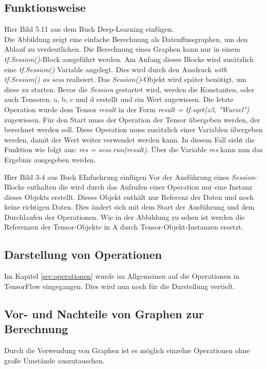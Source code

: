 \subsection{Funktionsweise}
\label{sec:graphenFunktionsweise}
Hier Bild 5.11 aus dem Buch Deep-Learning einfügen.\\
Die Abbildung zeigt eine einfache Berechnung als Datenflussgraphen, um den Ablauf zu verdeutlichen. Die Berechnung eines Graphen kann nur in einem \textit{tf.Session()}-Block ausgeführt werden. Am Anfang dieses Blocks wird zusätzlich eine \textit{tf.Session()} Variable angelegt. Dies wird durch den Ausdruck \textit{with tf.Session() as sess} realisiert. Das \textit{Session()}-Objekt wird später benötigt, um diese zu starten. Bevor die \textit{Session} gestartet wird, werden die Konstanten, oder auch Tensoren, a, b, c und d erstellt und ein Wert zugewiesen. Die letzte Operation wurde dem Tensor \textit{result} in der Form \textit{result = tf.sqrt(x3, "Wurzel")} zugewiesen. Für den Start muss der Operation der Tensor übergeben werden, der berechnet werden soll. Diese Operation muss zusätzlich einer Variablen übergeben werden, damit der Wert weiter verwendet werden kann. In diesem Fall sieht die Funktion wie folgt aus: \textit{res = sess.run(result)}. Über die Variable \textit{res} kann nun das Ergebnis ausgegeben werden.

Hier Bild 3-4 aus Buch EInfuehrung einfügen
Vor der Ausführung eines \textit{Session}-Blocks enthalten die wird durch das Aufrufen einer Operation nur eine Instanz dieses Objekts erstellt. Dieses Objekt enthält nur Referenz der Daten und noch keine richtigen Daten. Dies ändert sich mit dem Start der Ausführung und dem Durchlaufen der Operationen. Wie in der Abbildung zu sehen ist werden die Referenzen der Tensor-Objekte in A durch Tensor-Objekt-Instanzen ersetzt.

\subsection{Darstellung von Operationen}
\label{sec:darstellungOperationen}
Im Kapitel \ref{sec:operationen} wurde im Allgemeinen auf die Operationen in TensorFlow eingegangen. Dies wird nun noch für die Darstellung vertieft. 

\subsection{Vor- und Nachteile von Graphen zur Berechnung}
\label{sec:vorUndNachteile}
Durch die Verwendung von Graphen ist es möglich einzelne Operationen ohne große Umstände auszutauschen.


